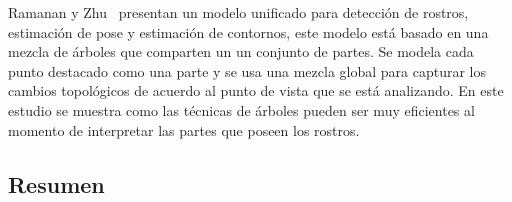 Ramanan y Zhu~\cite{Zhu2012} presentan un modelo unificado para detección de rostros, estimación de pose y estimación de contornos, este modelo está basado en una mezcla de árboles que comparten un un conjunto de partes. Se modela cada punto destacado como una parte y se usa una mezcla global para capturar los cambios topológicos de acuerdo al punto de vista que se está analizando. En este estudio se muestra como las técnicas de árboles pueden ser muy eficientes al momento de interpretar las partes que poseen los rostros.

\subsection{Resumen}